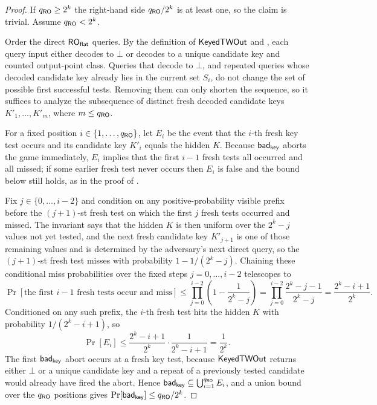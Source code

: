 \begin{proof}
If $q_{\mathsf{RO}} \geq 2^k$ the right-hand side $q_{\mathsf{RO}}/2^k$ is at least one, so the
claim is trivial. Assume $q_{\mathsf{RO}} < 2^k$.

Order the direct $\mathsf{RO}_{\mathsf{flat}}$ queries. By the definition of
$\mathsf{KeyedTWOut}$ and , each query input either
decodes to $\bot$ or decodes to a unique candidate key and counted
output-point class. Queries that decode to $\bot$, and repeated
queries whose decoded candidate key already lies in the current set
$S_i$, do
not change the set of possible first successful tests. Removing
them can only shorten the sequence, so it suffices to analyze the
subsequence of distinct fresh decoded candidate keys
$K'_1, \dots, K'_m$, where $m \leq q_{\mathsf{RO}}$.

For a fixed position $i \in \{1, \dots, q_{\mathsf{RO}}\}$, let $E_i$ be the
event that the $i$-th fresh key test occurs and its candidate key
$K'_i$ equals the hidden $K$. Because $\mathsf{bad}_{\mathsf{key}}$ aborts the game
immediately, $E_i$ implies that the first $i-1$ fresh tests all
occurred and all missed; if some earlier fresh test never occurs then
$E_i$ is false and the bound below still holds, as in the proof of
.

Fix $j \in \{0, \dots, i-2\}$ and condition on any positive-probability
visible prefix before the $(j+1)$-st fresh test on which the first $j$
fresh tests occurred and missed. The invariant says that the hidden $K$
is then uniform over the $2^k - j$ values not yet tested, and the next
fresh candidate key $K'_{j+1}$ is one of those remaining values and is
determined by the adversary's next direct query, so the $(j+1)$-st
fresh test misses with probability $1 - 1/(2^k - j)$. Chaining these
conditional miss probabilities over the fixed steps
$j = 0, \dots, i-2$ telescopes to
\[
  \Pr[\text{the first $i-1$ fresh tests occur and miss}]
  \leq \prod_{j=0}^{i-2} \left(1 - \frac{1}{2^k - j}\right)
  = \prod_{j=0}^{i-2} \frac{2^k - j - 1}{2^k - j}
  = \frac{2^k - i + 1}{2^k}.
\]
Conditioned on any such prefix, the $i$-th fresh test hits the hidden
$K$ with probability $1/(2^k - i + 1)$, so
\[
  \Pr[E_i]
  \leq \frac{2^k - i + 1}{2^k} \cdot \frac{1}{2^k - i + 1}
  = \frac{1}{2^k}.
\]
The first $\mathsf{bad}_{\mathsf{key}}$ abort occurs at a fresh key test, because
$\mathsf{KeyedTWOut}$ returns either $\bot$ or a unique candidate key and a
repeat of a previously tested candidate would already have fired the
abort. Hence $\mathsf{bad}_{\mathsf{key}} \subseteq \bigcup_{i=1}^{q_{\mathsf{RO}}} E_i$, and a union
bound over the $q_{\mathsf{RO}}$ positions gives
$\Pr[\mathsf{bad}_{\mathsf{key}}] \leq q_{\mathsf{RO}} / 2^k$.
\end{proof}

